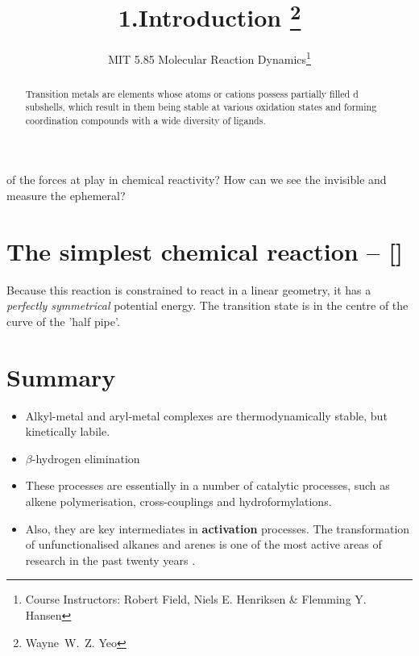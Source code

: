 \documentclass[a4paper]{tufte-handout}
\title{1.Introduction \thanks{Wayne~W.~Z. Yeo}}
\author[MIT 5.85]{\textnormal{MIT 5.85} Molecular Reaction Dynamics\thanks{Course Instructors: Robert Field, Niels E. Henriksen \& Flemming Y. Hansen}}
\begin{document}
\maketitle %

\begin{abstract}
\noindent
Transition metals are elements whose atoms or cations possess partially filled d subshells, which result
in them being stable at various oxidation states and forming coordination compounds with a wide diversity of
ligands.
\end{abstract}


 of the forces at play in chemical reactivity? How can we 
see the invisible and measure the ephemeral? 

\section*{The simplest chemical reaction -- \textnormal{[]}}

Because this reaction is constrained to react in a linear geometry, it has a \textit{perfectly symmetrical}
potential energy. The transition state is in the centre of the curve of the 'half pipe'.

\section{Summary}

\begin{itemize}
  \item Alkyl-metal and aryl-metal complexes are thermodynamically stable, but kinetically labile.
  \item $\beta$-hydrogen elimination 
  \item These processes are essentially in a number of catalytic processes, such as alkene polymerisation, cross-couplings and hydroformylations.
  \item Also, they are key intermediates in \textbf{ activation} processes. The transformation of unfunctionalised alkanes and arenes is one of the most active areas of research in the past twenty years \cite{guillemard2021late}.
\end{itemize}



\end{document}
